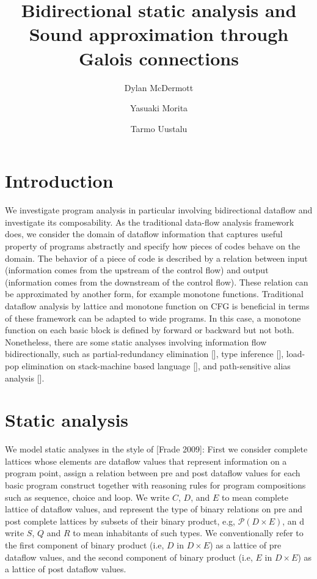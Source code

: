 \documentclass{easychair}
\title{Bidirectional static analysis and Sound approximation through Galois connections}
\author{
  Dylan McDermott \inst{1}
\and
  Yasuaki Morita  \inst{1}
\and
  Tarmo Uustalu   \inst{1}
}
\institute{
  Reykjavik University,
  Reykjav{\'i}k, Iceland\\
  \email{dylanm@ru.is}, \email{yasuaki20@ru.is}, \email{tarmo@ru.is}
}
\theoremstyle{definition}
\newcommand{\Pow}{\mathcal{P}}
\begin{document}
\maketitle

\section{Introduction}

We investigate program analysis in particular involving bidirectional dataflow and investigate its composability.
As the traditional data-flow analysis framework does, we consider the domain of dataflow information that captures useful property of programs abstractly and specify how pieces of codes behave on the domain.
The behavior of a piece of code is described by a relation between input (information comes from the upstream of the control flow) and output (information comes from the downstream of the control flow).
These relation can be approximated by another form, for example monotone functions.
Traditional dataflow analysis by lattice and monotone function on CFG is beneficial in terms of these framework can be adapted to wide programs.
In this case, a monotone function on each basic block is defined by forward or backward but not both.
Nonetheless, there are some static analyses involving information flow bidirectionally, such as partial-redundancy elimination [], type inference [], load-pop elimination on stack-machine based language [], and path-sensitive alias analysis [].

\section{Static analysis}
We model static analyses in the style of [Frade 2009]: First we consider
complete lattices whose elements are dataflow values that represent
information on a program point, assign a relation between pre and post
dataflow values for each basic program construct together with reasoning
rules for program compositions such as sequence, choice and loop. We
write $C$, $D$, and $E$ to mean complete lattice of dataflow values, and
represent the type of binary relations on pre and post complete lattices
by subsets of their binary product, e.g, $\Pow(D \times E)$, an d write $S$,
$Q$ and $R$ to mean inhabitants of such types. We conventionally refer
to the first component of binary product (i.e, $D$ in $D \times E$) as a
lattice of pre dataflow values, and the second component of binary
product (i.e, $E$ in $D \times E$) as a lattice of post dataflow values.
\end{document}

